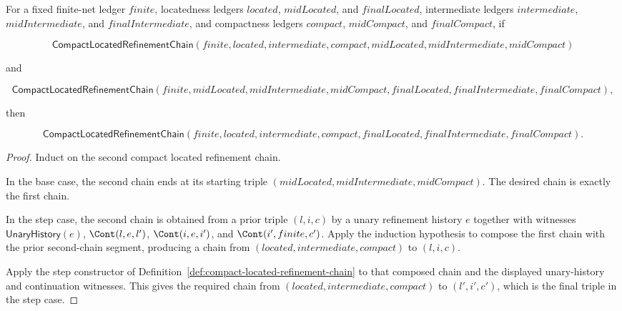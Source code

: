 \begin{theorem}
\label{thm:compact-located-refinement-chain-transitivity}
For a fixed finite-net ledger $finite$, locatedness ledgers $located$,
$midLocated$, and $finalLocated$, intermediate ledgers $intermediate$,
$midIntermediate$, and $finalIntermediate$, and compactness ledgers $compact$,
$midCompact$, and $finalCompact$, if

$$
\mathsf{CompactLocatedRefinementChain}(finite,located,intermediate,compact,midLocated,midIntermediate,midCompact)
$$

and

$$
\mathsf{CompactLocatedRefinementChain}(finite,midLocated,midIntermediate,midCompact,finalLocated,finalIntermediate,finalCompact),
$$

then

$$
\mathsf{CompactLocatedRefinementChain}(finite,located,intermediate,compact,finalLocated,finalIntermediate,finalCompact).
$$
\end{theorem}
\begin{proof}
Induct on the second compact located refinement chain.

In the base case, the second chain ends at its starting triple
$(midLocated,midIntermediate,midCompact)$. The desired chain is exactly the first
chain.

In the step case, the second chain is obtained from a prior triple $(l,i,c)$ by
a unary refinement history $e$ together with witnesses $\mathsf{UnaryHistory}(e)$,
$\Cont(l,e,l')$, $\Cont(i,e,i')$, and $\Cont(i',finite,c')$. Apply the induction
hypothesis to compose the first chain with the prior second-chain segment,
producing a chain from $(located,intermediate,compact)$ to $(l,i,c)$.

Apply the step constructor of
Definition~\ref{def:compact-located-refinement-chain} to that composed chain and
the displayed unary-history and continuation witnesses. This gives the required
chain from $(located,intermediate,compact)$ to $(l',i',c')$, which is the final
triple in the step case.
\end{proof}

